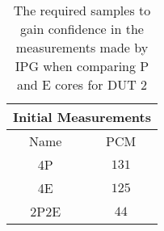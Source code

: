 \begin{table}[H]
    \centering
    \begin{tabular}{|| c | c ||}
    \hline
    \multicolumn{2}{||c||}{Initial Measurements} \\ [0.5ex] \hline\hline
    Name & PCM \\\hline
    4P & $131$ \\
    4E & $125$ \\
    2P2E& $44$ \\\hline
    \end{tabular}
    \caption{The required samples to gain confidence in the measurements made by IPG when comparing P and E cores for DUT 2}
    \label{tab:initial-measurements-bonus}
\end{table}
